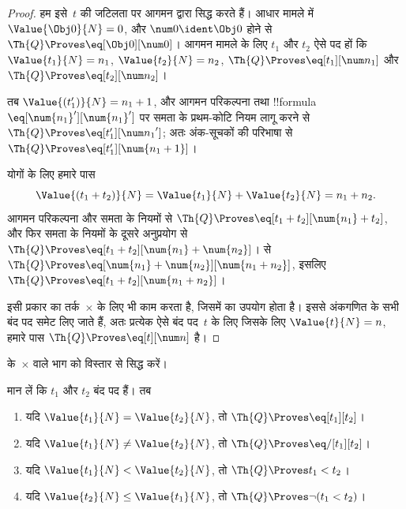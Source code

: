 \documentclass[../../../include/open-logic-section]{subfiles}
\begin{document}
\begin{proof}
हम इसे~$t$ की जटिलता पर आगमन द्वारा सिद्ध करते हैं। आधार मामले में
$\Value{\Obj 0}{N} = 0$, और $\num 0 \ident \Obj 0$ होने से
$\Th{Q} \Proves \eq[\Obj 0][\num 0]$।
%
आगमन मामले के लिए $t_1$ और $t_2$ ऐसे पद हों कि
$\Value{t_1}{N} = n_1$, $\Value{t_2}{N} = n_2$,
$\Th{Q} \Proves \eq[t_1][\num n_1]$ और
$\Th{Q} \Proves \eq[t_2][\num n_2]$।

तब $\Value{(t_1')}{N} = n_1 + 1$, और आगमन परिकल्पना तथा !!{formula}
$\eq[\num{n_1}'][\num{n_1}']$ पर समता के प्रथम-कोटि नियम लागू करने से
$\Th{Q} \Proves \eq[t_1'][{\num n_1}']$; अतः अंक-सूचकों की परिभाषा से
$\Th{Q} \Proves \eq[t_1'][\num{n_1 + 1}]$।

योगों के लिए हमारे पास
\[
      \Value{(t_1 + t_2)}{N}
    = \Value{t_1}{N} + \Value{t_2}{N}
    = n_1 + n_2.
\]
आगमन परिकल्पना और समता के नियमों से
$\Th{Q} \Proves \eq[t_1 + t_2][\num{n_1} + t_2]$, और फिर समता के नियमों
के दूसरे अनुप्रयोग से
$\Th{Q} \Proves \eq[t_1 + t_2][\num{n_1} + \num{n_2}]$।
 से
$\Th{Q} \Proves \eq[\num{n_1} + \num{n_2}][\num{n_1 + n_2}]$, इसलिए
$\Th{Q} \Proves \eq[t_1 + t_2][\num{n_1 + n_2}]$।

इसी प्रकार का तर्क~$\times$ के लिए भी काम करता है, जिसमें
 का उपयोग होता है।
%
इससे अंकगणित के सभी बंद पद समेट लिए जाते हैं, अतः प्रत्येक ऐसे बंद पद~$t$
के लिए जिसके लिए $\Value{t}{N} = n$, हमारे पास
$\Th{Q} \Proves \eq[t][\num n]$ है।
\end{proof}

\begin{prob}
 के~$\times$ वाले भाग को विस्तार से सिद्ध
करें।
\end{prob}

\begin{lem}
मान लें कि $t_1$ और $t_2$ बंद पद हैं। तब
\begin{enumerate}
\item यदि $\Value{t_1}{N} = \Value{t_2}{N}$, तो
    $\Th{Q} \Proves \eq[t_1][t_2]$।
\item यदि $\Value{t_1}{N} \neq \Value{t_2}{N}$, तो
    $\Th{Q} \Proves \eq/[t_1][t_2]$।
\item यदि $\Value{t_1}{N} < \Value{t_2}{N}$, तो
    $\Th{Q} \Proves t_1 < t_2$।
\item यदि $\Value{t_2}{N} \leq \Value{t_1}{N}$, तो
    $\Th{Q} \Proves \lnot(t_1 < t_2)$।
\end{enumerate}
\end{lem}
\end{document}
